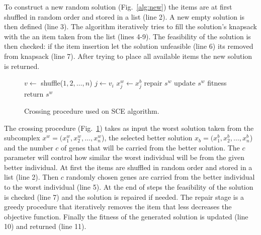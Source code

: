 \documentclass[10pt,conference, compsocconf]{IEEEtran}
\begin{document}
To construct a new random solution (Fig.~\ref{alg:new}) the items are
at first shuffled in random order and stored in a list (line 2).
A new empty solution is then defined (line 3).
The algorithm iteratively tries to fill the solution's knapsack with 
the an item taken from the list (lines 4-9).
The feasibility of the solution is then checked: if the item insertion let
the solution unfeasible (line 6) its removed from knapsack (line 7).
After trying to place all available items the new solution is returned.

\begin{figure}
\begin{algorithmic}[1]
    \State $v \leftarrow $ shuffle($1, 2, \ldots, n$)
	  \State $j \leftarrow v_i$
	  \State $x^w_j \leftarrow x^b_j$ 
	\EndFor
	  \State repair $s^w$
	\EndIf
	\State update $s^w$ fitness
  \State return $s^w$
  \EndProcedure
\end{algorithmic}
\caption{Crossing procedure used on SCE algorithm.}
\label{alg:cross}
\end{figure}

The crossing procedure (Fig.~\ref{alg:cross}) takes as input the worst
solution taken from the subcomplex $x^w = (x^w_1, x^w_2, \ldots, x^w_n$),
the selected better solution $x_b = (x^b_1, x^b_2, \ldots, x^b_n$)
and the number $c$ of genes that will be carried from the better solution.
The $c$ parameter will control how similar the worst individual will be from the
given better individual.
At first the items are shuffled in random order and stored in a list (line 2).
Then $c$ randomly chosen genes are carried from the better individual to the worst
individual (line 5).
At the end of steps the feasibility of the solution is checked (line 7) and
the solution is repaired if needed.
The repair stage is a greedy procedure that iteratively removes the item that less
decreases the objective function.
Finally the fitness of the generated solution is updated (line 10) and
returned (line 11).
\end{document}
